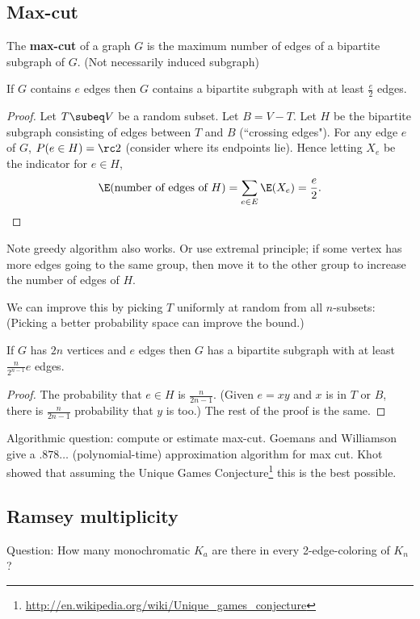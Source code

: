\subsection{Max-cut}
\begin{df}
The \textbf{max-cut} of a graph $G$ is the maximum number of edges of a bipartite subgraph of $G$. (Not necessarily induced subgraph)
\end{df}
\begin{thm}
If $G$ contains $e$ edges then $G$ contains a bipartite subgraph with at least $\frac e2$ edges.
\end{thm}
\begin{proof}
Let $T\subeq V$ be a random subset. Let $B=V-T$. Let $H$ be the bipartite subgraph consisting of edges between $T$ and $B$ (``crossing edges"). For any edge $e$ of $G$, $P(e\in H)=\rc 2$ (consider where its endpoints lie). Hence letting $X_e$ be the indicator for $e\in H$,
\[
\E(\text{number of edges of }H)=\sum_{e\in E} \E(X_e)=\frac e2.
\]
\end{proof}
Note greedy algorithm also works. Or use extremal principle; if some vertex has more edges going to the same group, then move it to the other group to increase the number of edges of $H$.

We can improve this by picking $T$ uniformly at random from all $n$-subsets: (Picking a better probability space can improve the bound.)
\begin{thm}
If $G$ has $2n$ vertices and $e$ edges then $G$ has a bipartite subgraph with at least $\frac{n}{2^{n-1}}e$ edges. 
\end{thm}
\begin{proof}
The probability  that $e\in H$ is $\frac{n}{2n-1}$. (Given $e=xy$ and $x$ is in $T$ or $B$, there is $\frac{n}{2n-1}$ probability that $y$ is too.) The rest of the proof is the same.
\end{proof}

Algorithmic question: compute or estimate max-cut. Goemans and Williamson give a $.878\ldots $ (polynomial-time) approximation algorithm for max cut. Khot showed that assuming the Unique Games Conjecture\footnote{ \url{http://en.wikipedia.org/wiki/Unique_games_conjecture}} this is the best possible.
\subsection{Ramsey multiplicity}
Question: How many monochromatic $K_a$ are there in every 2-edge-coloring of $K_n$?

